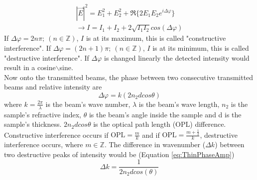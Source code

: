 \documentclass[reprint,amsmath,amssymb,aps, prl,superscriptaddress]{revtex4-2}
\begin{document}
\begin{equation*}
\begin{split}
    |\vec{E}|^2 = E_{1}^2 + E_2^2 + \Re\{2E_{1}E_{2}e^{i\Delta\varphi}\}\\ \rightarrow I=I_1+I_2+2\sqrt{I_1I_2}cos(\Delta\varphi)
\end{split}
\end{equation*}
If $\Delta\varphi=2n\pi;\ (n\in\mathbb{Z})$, $I$ is at its maximum, this is called "constructive interference". If $\Delta\varphi=(2n+1)\pi;\ (n\in\mathbb{Z})$, $I$ is at its minimum, this is called "destructive interference". If $\Delta\varphi$ is changed linearly the detected intensity would result in a cosine$\backslash$sine\cite{FundamentalsOfPhotonics}.\\
Now onto the transmitted beams, the phase between two consecutive transmitted beams and relative intensity are
\begin{equation} \label{eq:ThinPhaseAmp}
\Delta\varphi=k(2n_{2}dcos\theta)
\end{equation}
where $k=\frac{2\pi}{\lambda}$ is the beam's wave number, $\lambda$ is the beam's wave length, $n_{2}$ is the sample's refractive index, $\theta$ is the beam's angle inside the sample and d is the sample's thickness. $2n_{2}dcos\theta$ is the optical path length (OPL) difference. Constructive interference occurs if $\text{OPL}=\frac{m}{k}$ and if $\text{OPL}=\frac{m+\frac{1}{2}}{k}$, destructive interference occurs, where $m\in\mathbb{Z}$. The difference in wavenumber ($\Delta k$) between two destructive peaks of intensity would be (Equation \ref{eq:ThinPhaseAmp})
\begin{equation} \label{eq:ThinDiffWavenum}
\Delta k=\frac{1}{2n_{2}dcos(\theta)}
\end{equation}

\end{document}
